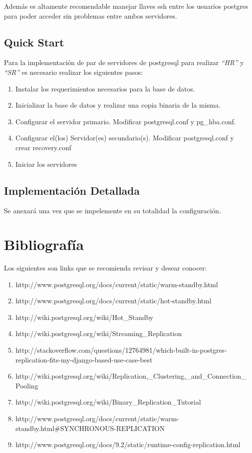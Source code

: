 \documentclass[11pt]{article}
\begin{document}
Adem\'as es altamente recomendable manejar llaves ssh entre los usuarios postgres para poder acceder sin problemas entre ambos servidores.

\subsection{Quick Start}
Para la implementaci\'on de par de servidores de postgresql para realizar \textit{``HR''} y \textit{``SR''} es necesario realizar los siguientes pasos:

\begin{enumerate}
\item Instalar los requerimientos necesarios para la base de datos.
\item Inicializar la base de datos y realizar una copia binaria de la misma.
\item Configurar el servidor primario. Modificar postgresql.conf y pg\_hba.conf.
\item Configurar el(los) Servidor(es) secundario(s). Modificar postgresql.conf y crear recovery.conf
\item Iniciar los servidores
\end{enumerate}

\subsection{Implementaci\'on Detallada}
Se anexar\'a una vez que se impelemente en su totalidad la configuraci\'on.\\


\newpage

\section{Bibliograf\'ia}
Los siguientes son links que se recomienda revisar y desear conocer:
\begin{enumerate}
\item http://www.postgresql.org/docs/current/static/warm-standby.html
\item http://www.postgresql.org/docs/current/static/hot-standby.html
\item http://wiki.postgresql.org/wiki/Hot\_Standby
\item http://wiki.postgresql.org/wiki/Streaming\_Replication
\item http://stackoverflow.com/questions/12764981/which-built-in-postgres-replication-fits-my-django-based-use-case-best
\item http://wiki.postgresql.org/wiki/Replication,\_Clustering,\_and\_Connection\_Pooling
\item http://wiki.postgresql.org/wiki/Binary\_Replication\_Tutorial
\item http://www.postgresql.org/docs/current/static/warm-standby.html\#SYNCHRONOUS-REPLICATION
\item http://www.postgresql.org/docs/9.2/static/runtime-config-replication.html
\end{enumerate}
\end{document}
